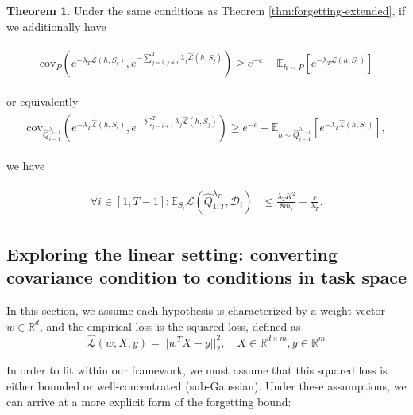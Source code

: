 \documentclass[letterpaper]{article}
\theoremstyle{definition}
\newtheorem{theorem}{Theorem}
\begin{document}
\begin{theorem}
    Under the same conditions as Theorem \ref{thm:forgetting-extended}, if we additionally have

    \begin{align*} 
\begin{split}
\mathrm{cov}_{P}(e^{-\lambda_T\hat{\mathcal{L}}(h,S_i)}, e^{-\sum_{j=1,j\neq i}^{T}\lambda_j\hat{\mathcal{L}}(h,S_j)})
 \geq e^{-c}-\mathbb{E}_{h\sim P}\left [e^{-\lambda_T\hat{\mathcal{L}}(h,S_i)} \right ]
\end{split}
\end{align*}

    or equivalently
\begin{align*} 
\begin{split}
\mathrm{cov}_{\hat{Q}^{\lambda_{i-1}}_{i-1}}(e^{-\lambda_T\hat{\mathcal{L}}(h,S_i)}, e^{-\sum_{j=i+1}^{T}\lambda_j\hat{\mathcal{L}}(h,S_j)})
 \geq e^{-c}-\mathbb{E}_{h\sim \hat{Q}^{\lambda_{i-1}}_{i-1}}\left [e^{-\lambda_T\hat{\mathcal{L}}(h,S_i)} \right ],
\end{split}
\end{align*}

we have 

    \begin{align*} 
\begin{split}
\forall i\in[1,T-1]:
\mathbb{E}_{S_i}\mathcal{L}(\hat{Q}^{\lambda_T}_{1:T}, \mathcal{D}_i) &\leq \frac{\lambda_T K^2}{8m_i}+\frac{c}{\lambda_T}.
\end{split}
\end{align*}

\end{theorem}

\subsection{Exploring the linear setting: converting covariance condition to conditions in task space}

In this section, we assume each hypothesis is characterized by a weight vector $w\in \mathbb{R}^d$, and the empirical loss is the squared loss, defined as $$\hat{\mathcal{L}}(w,X,y)=||w^TX-y||_2^2, \quad X\in \mathbb{R}^{d\times m},y\in\mathbb{R}^{m}$$

In order to fit within our framework, we must assume that this squared loss is either bounded or well-concentrated (sub-Gaussian). Under these assumptions, we can arrive at a more explicit form of the forgetting bound:
\end{document}
